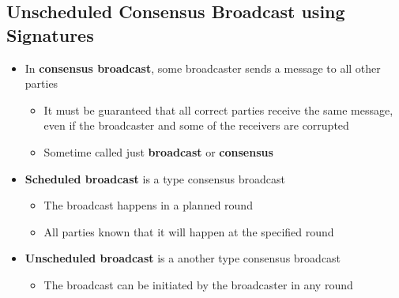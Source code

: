 \documentclass[11pt]{article}
\begin{document}
\subsection{Unscheduled Consensus Broadcast using Signatures}
\label{sec:org70659f3}
\begin{itemize}
\item In \textbf{consensus broadcast}, some broadcaster sends a message to all other parties
\begin{itemize}
\item It must be guaranteed that all correct parties receive the same message, even if the broadcaster and some of the receivers are corrupted
\item Sometime called just \textbf{broadcast} or \textbf{consensus}
\end{itemize}

\item \textbf{Scheduled broadcast} is a type consensus broadcast
\begin{itemize}
\item The broadcast happens in a planned round
\item All parties known that it will happen at the specified round
\end{itemize}

\item \textbf{Unscheduled broadcast} is a another type consensus broadcast
\begin{itemize}
\item The broadcast can be initiated by the broadcaster in any round
\end{itemize}


\end{itemize}
\end{document}
